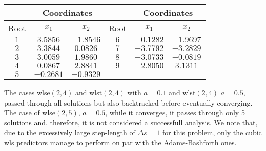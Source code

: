 \begin{table}[b]
	\centering
	\begin{minipage}{0.75\textwidth}
		\label{table:TABLE_CH5EX2_B}
		\small
		\renewcommand{\arraystretch}{1.25}
		\begin{tabular}{c c c c c c}
			\hline\hline
			& \multicolumn{2}{c}{Coordinates} & & 
			\multicolumn{2}{c}{Coordinates} \\
			\hline
			Root  & $x_1$ & $x_2$ &  Root  & $x_1$  & $x_2$ \\
			\hline
			$1$ & $3.5856$ & $-1.8546$ & $6$ & $-0.1282$ & $-1.9697$ \\
			$2$ & $3.3844$ & $0.0826$  & $7$ & $-3.7792$ & $-3.2829$ \\
			$3$ & $3.0059$ & $1.9860$  & $8$ & $-3.0733$ & $-0.0819$ \\
			$4$ & $0.0867$ & $2.8841$  & $9$ & $-2.8050$ & $3.1311$ \\
			$5$ & $-0.2681$ & $-0.9329$ &  &  &  \\
			\hline\hline
		\end{tabular}
	\end{minipage}
\end{table}
The cases \acrshort{wlse}$(2,4)$ and \acrshort{wlst}$(2,4)$ with $a=0.1$ and 
\acrshort{wlst}$(2,4)$ $a=0.5$,
passed through all solutions but also backtracked  before eventually converging.
The case of \acrshort{wlse}$(2,5)$, $a=0.5$, while it converges, it passes 
through only 5 
solutions and, therefore, it is not considered a successfull
analysis. We note that, due to the excessively large step-length of $\Delta
s=1$ for this problem, only the cubic \acrshort{wls} predictors manage to 
perform on par with the Adams-Bashforth ones. 

